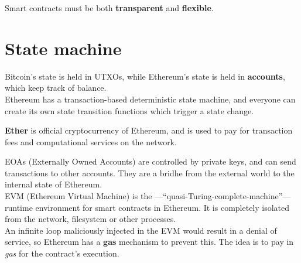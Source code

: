 Smart contracts must be both \textbf{transparent} and \textbf{flexible}.


\section{State machine}
Bitcoin's state is held in UTXOs, while Ethereum's state is held in \textbf{accounts}, which keep track of balance.\\
Ethereum has a transaction-based deterministic state machine, and everyone can create its own state transition functions which trigger a state change.


\textbf{Ether} is official cryptocurrency of Ethereum, and is used to pay for transaction fees and computational services on the network.

EOAs (Externally Owned Accounts) are controlled by private keys, and can send transactions to other accounts. They are a bridhe from the external world to the internal state of Ethereum.\\

EVM (Ethereum Virtual Machine) is the ---``quasi-Turing-complete-machine''---runtime environment for smart contracts in Ethereum. It is completely isolated from the network, filesystem or other processes.\\
An infinite loop maliciously injected in the EVM would result in a denial of service, so Ethereum has a \textbf{gas} mechanism to prevent this.
The idea is to pay in \textit{gas} for the contract's execution.


